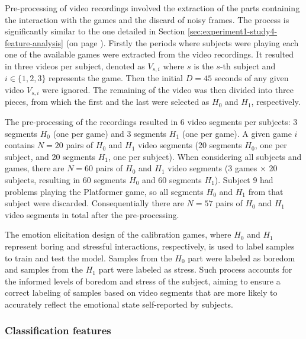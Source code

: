 Pre-processing of video recordings involved the extraction of the parts containing the interaction with the games and the discard of noisy frames. The process is significantly similar to the one detailed in Section \ref{sec:experiment1-study4-feature-analysis} (on page \pageref{sec:experiment1-study4-feature-analysis}). Firstly the periods where subjects were playing each one of the available games were extracted from the video recordings. It resulted in three videos per subject, denoted as $V_{s,i}$ where $s$ is the $s$-th subject and $i \in \{1, 2, 3\}$ represents the game. Then the initial $D=45$ seconds of any given video $V_{s,i}$ were ignored. The remaining of the video was then divided into three pieces, from which the first and the last were selected as $H_0$ and $H_1$, respectively.

The pre-processing of the recordings resulted in 6 video segments per subjects: 3 segments $H_0$ (one per game) and 3 segments $H_1$ (one per game). A given game $i$ contains $N=20$ pairs of $H_0$ and $H_1$ video segments (20 segments $H_0$, one per subject, and 20 segments $H_1$, one per subject). When considering all subjects and games, there are $N=60$ pairs of $H_0$ and $H_1$ video segments (3 games $\times$ 20 subjects, resulting in 60 segments $H_0$ and 60 segments $H_1$). Subject 9 had problems playing the Platformer game, so all segments $H_0$ and $H_1$ from that subject were discarded. Consequentially there are $N=57$ pairs of $H_0$ and $H_1$ video segments in total after the pre-processing.

The emotion elicitation design of the calibration games, where $H_0$ and $H_1$ represent boring and stressful interactions, respectively, is used to label samples to train and test the model. Samples from the $H_0$ part were labeled as boredom and samples from the $H_1$ part were labeled as stress. Such process accounts for the informed levels of boredom and stress of the subject, aiming to ensure a correct labeling of samples based on video segments that are more likely to accurately reflect the emotional state self-reported by subjects.

\subsubsection{Classification features}

